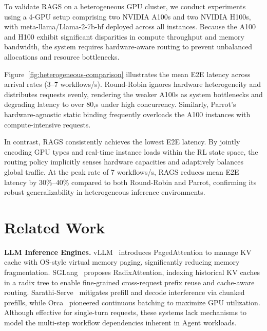 \documentclass[sigconf,review,anonymous]{acmart}
\begin{document}
To validate RAGS on a heterogeneous GPU cluster, we conduct experiments using a 4-GPU 
setup comprising two NVIDIA A100s and two NVIDIA H100s, with meta-llama/Llama-2-7b-hf 
deployed across all instances. Because the A100 and H100 exhibit significant disparities 
in compute throughput and memory bandwidth, the system requires hardware-aware routing to 
prevent unbalanced allocations and resource bottlenecks.

Figure~\ref{fig:heterogeneous-comparison} illustrates the mean E2E latency across arrival 
rates (3--7 workflows/s). Round-Robin ignores hardware heterogeneity and distributes 
requests evenly, rendering the weaker A100s as system bottlenecks and degrading latency 
to over 80,s under high concurrency. Similarly, Parrot's hardware-agnostic static binding 
frequently overloads the A100 instances with compute-intensive requests.

In contrast, RAGS consistently achieves the lowest E2E latency. By jointly encoding GPU 
types and real-time instance loads within the RL state space, the routing policy implicitly
 senses hardware capacities and adaptively balances global traffic. At the peak rate of 7 
 workflows/s, RAGS reduces mean E2E latency by 30\%--40\% compared to both Round-Robin and 
 Parrot, confirming its robust generalizability in heterogeneous inference environments.

\section{Related Work}\label{sec:related-work}

\textbf{LLM Inference Engines.}
vLLM~\cite{kwon2023efficient} introduces PagedAttention to manage KV cache
with OS-style virtual memory paging, significantly reducing memory fragmentation.
 SGLang~\cite{zheng2024sglang} proposes RadixAttention, 
indexing historical KV caches in a radix tree to enable fine-grained cross-request 
prefix reuse and cache-aware routing.
Sarathi-Serve~\cite{agrawal2024taming} mitigates prefill and decode interference via 
chunked prefills, while Orca~\cite{yu2022orca} pioneered continuous batching to maximize 
GPU utilization. Although effective for single-turn requests, these systems 
lack mechanisms to model the multi-step workflow dependencies inherent 
in Agent workloads.
\end{document}
